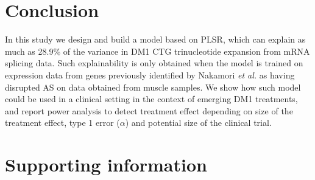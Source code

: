\documentclass[10pt,letterpaper]{article}
\newlength\savedwidth
\newcommand\thickhline{\noalign{\global\savedwidth\arrayrulewidth\global\arrayrulewidth 2pt}%
\hline
\noalign{\global\arrayrulewidth\savedwidth}}
\begin{document}

\section*{Conclusion}

In this study we design and build a model based on PLSR, which can explain as much as 28.9\% of the variance in DM1 CTG trinucleotide expansion from mRNA splicing data. Such explainability is only obtained when the model is trained on expression data from genes previously identified by Nakamori {\it et al.} \cite{Nakamori2013} as having disrupted AS on data obtained from muscle samples. We show how such model could be used in a clinical setting in the context of emerging DM1 treatments, and report power analysis to detect treatment effect depending on size of the treatment effect, type 1 error ($\alpha$) and potential size of the clinical trial.

\section*{Supporting information}
\end{document}

